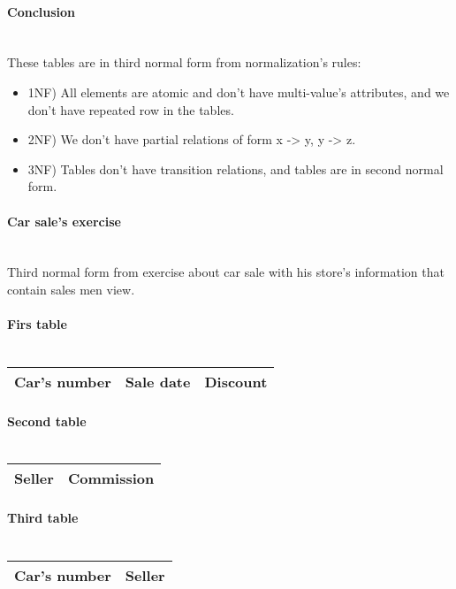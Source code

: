 \documentclass{article}
\begin{document}
\paragraph{Conclusion\\\\}
These tables are in third normal form from normalization's rules:
\begin{itemize}
\item 1NF) All elements are atomic and don't have multi-value's attributes, and we don't have repeated row in the tables.
\item 2NF) We don't have partial relations of form x -> y, y -> z.
\item 3NF) Tables don't have transition relations, and tables are in second normal form.
\end{itemize}
\newpage
\paragraph{Car sale's exercise\\\\}
Third normal form from exercise about car sale with his store's information that contain sales men view.
\paragraph{Firs table\\\\}
\begin{tabular}{|c|c|c|}
Car's number & Sale date & Discount\\
\hline
\end{tabular}
\paragraph{Second table\\\\}
\begin{tabular}{|c|c|}
Seller & Commission\\
\hline
\end{tabular}
\paragraph{Third table\\\\}
\begin{tabular}{|c|c|}
Car's number & Seller\\
\hline
\end{tabular}
\end{document}
